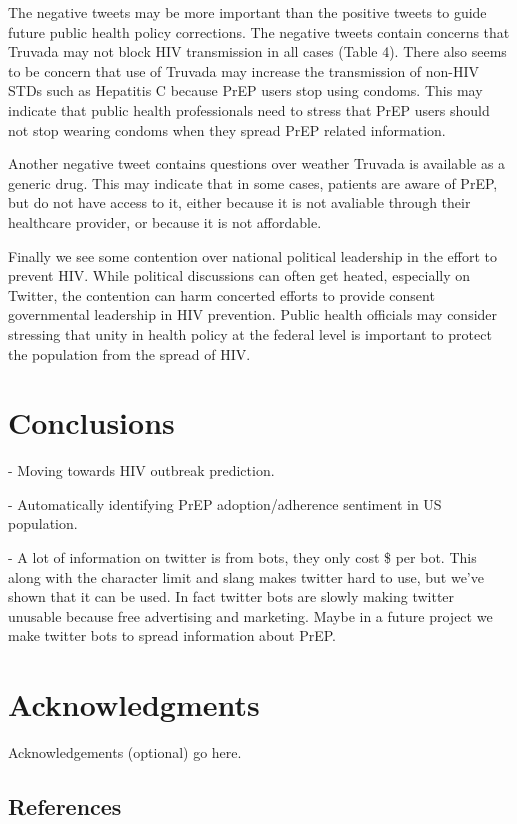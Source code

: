 \documentclass{sig-alternate-05-2015}
\begin{document}
The negative tweets may be more important than the positive tweets to guide future public health policy corrections. The negative tweets contain concerns that Truvada may not block HIV transmission in all cases (Table 4). There also seems to be concern that use of Truvada may increase the transmission of non-HIV STDs such as Hepatitis C because PrEP users stop using condoms. This may indicate that public health professionals need to stress that PrEP users should not stop wearing condoms when they spread PrEP related information.

Another negative tweet contains questions over weather Truvada is available as a generic drug. This may indicate that in some cases, patients are aware of PrEP, but do not have access to it, either because it is not avaliable through their healthcare provider, or because it is not affordable.

Finally we see some contention over national political leadership in the effort to prevent HIV. While political discussions can often get heated, especially on Twitter, the contention can harm concerted efforts to provide consent governmental leadership in HIV prevention. Public health officials may consider stressing that unity in health policy at the federal level is important to protect the population from the spread of HIV.

\section{Conclusions}

- Moving towards HIV outbreak prediction. 

- Automatically identifying PrEP adoption/adherence sentiment in US population.

- A lot of information on twitter is from bots, they only cost \$ per bot. This along with the character limit and slang makes twitter hard to use, but we've shown that it can be used. In fact twitter bots are slowly making twitter unusable because free advertising and marketing. Maybe in a future project we make twitter bots to spread information about PrEP.


\section{Acknowledgments}

Acknowledgements (optional) go here.

%

%
%


\subsection{References}
\end{document}
